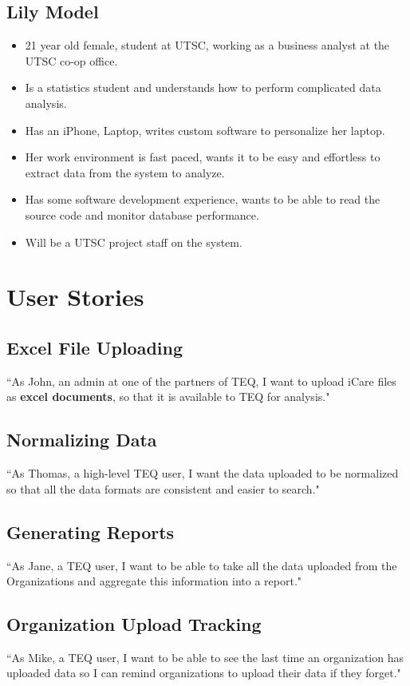 \documentclass[12pt]{article}
\begin{document}
 \subsection{Lily Model}
\begin{itemize}%
\item 21 year old female, student at UTSC, working as a business analyst at the UTSC co-op office.
\item Is a statistics student and understands how to perform complicated data analysis.
\item Has an iPhone, Laptop, writes custom software to personalize her laptop.
\item Her work environment is fast paced, wants it to be easy and effortless to extract data from the system to analyze. 
\item Has some software development experience, wants to be able to read the source code and monitor database performance.
\item Will be a UTSC project staff on the system.
 \end{itemize}

\pagebreak

\section{User Stories}
\subsection{Excel File Uploading}
``As John, an admin at one of the partners of TEQ, I want to upload iCare files as \textbf{excel documents}, so that it is available to TEQ for analysis."

\subsection{Normalizing Data}
``As Thomas, a high-level TEQ user, I want the data uploaded to be normalized so that all the data formats are consistent and easier to search."

\subsection{Generating Reports}
``As Jane, a TEQ user,  I want to be able to take all the data uploaded from the Organizations and aggregate this information into a report."

\subsection{Organization Upload Tracking}
``As Mike, a TEQ user, I want to be able to see the last time an organization has uploaded data so I can remind organizations to upload their data if they forget."
\end{document}
